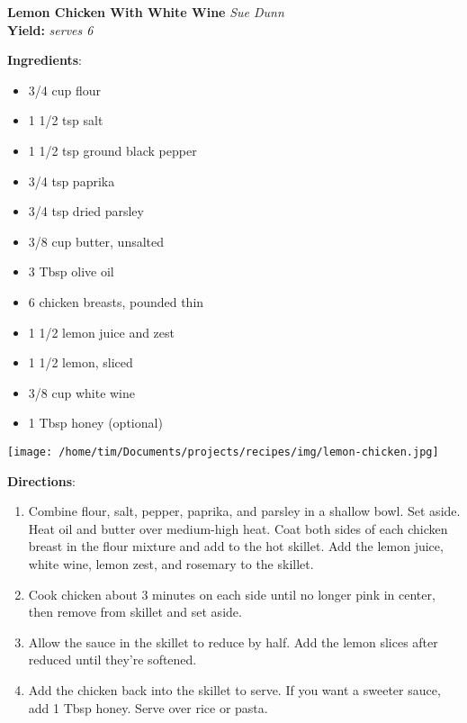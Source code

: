 \documentclass[11pt, twoside, openany]{book}
\begin{document}
\noindent\begin{minipage}[t]{\linewidth}%
{\Large\textbf{Lemon Chicken With White Wine}} \label{lemon-chicken-with-white-wine}\hfill\textit{Sue Dunn}\\
\textbf{Yield:} \textit{serves 6}\\
\noindent\begin{minipage}[t]{0.78\linewidth}%
\textbf{Ingredients}:\vspace{-3mm}
\begin{multicols}{2}
\begin{itemize}\setlength\itemsep{-1mm}
\item 3/4 cup flour
\item 1 1/2 tsp salt
\item 1 1/2 tsp ground black pepper
\item 3/4 tsp paprika
\item 3/4 tsp dried parsley
\item 3/8 cup butter, unsalted
\item 3 Tbsp olive oil
\item 6 chicken breasts, pounded thin
\item 1 1/2 lemon juice and zest
\item 1 1/2 lemon, sliced
\item 3/8 cup white wine
\item 1 Tbsp honey (optional)
\end{itemize}
\end{multicols}
\end{minipage}
\noindent\begin{minipage}[t]{0.18\linewidth}
\centering \strut\vspace*{-\baselineskip}\newline
\texttt{[image: /home/tim/Documents/projects/recipes/img/lemon-chicken.jpg]}\\
\end{minipage}\vspace{3mm}
\textbf{Directions}:
\vspace{-3mm}\begin{enumerate}\setlength\itemsep{-1mm}
\item Combine flour, salt, pepper, paprika, and parsley in a shallow bowl. Set aside. Heat oil and butter over medium-high heat. Coat both sides of each chicken breast in the flour mixture and add to the hot skillet. Add the lemon juice, white wine, lemon zest, and rosemary to the skillet.
\item Cook chicken about 3 minutes on each side until no longer pink in center, then remove from skillet and set aside.
\item Allow the sauce in the skillet to reduce by half. Add the lemon slices after reduced until they're softened.
\item Add the chicken back into the skillet to serve. If you want a sweeter sauce, add 1 Tbsp honey. Serve over rice or pasta.
\end{enumerate}
\end{minipage}\vspace{8mm}
\end{document}
